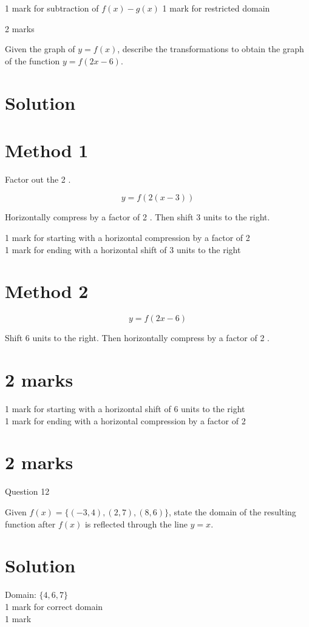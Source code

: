 \documentclass[10pt]{article}
\begin{document}
1 mark for subtraction of $f(x)-g(x)$ 1 mark for restricted domain

2 marks

Given the graph of $y=f(x)$, describe the transformations to obtain the graph of the function $y=f(2 x-6)$.

\section*{Solution}
\section*{Method 1}
Factor out the 2 .

$$
y=f(2(x-3))
$$

Horizontally compress by a factor of 2 . Then shift 3 units to the right.

1 mark for starting with a horizontal compression by a factor of 2\\
1 mark for ending with a horizontal shift of 3 units to the right

\section*{Method 2}
$$
y=f(2 x-6)
$$

Shift 6 units to the right. Then horizontally compress by a factor of 2 .

\section*{2 marks}
1 mark for starting with a horizontal shift of 6 units to the right\\
1 mark for ending with a horizontal compression by a factor of 2

\section*{2 marks}
Question 12

Given $f(x)=\{(-3,4),(2,7),(8,6)\}$, state the domain of the resulting function after $f(x)$ is reflected through the line $y=x$.

\section*{Solution}
Domain: $\{4,6,7\}$\\
1 mark for correct domain\\
1 mark
\end{document}
